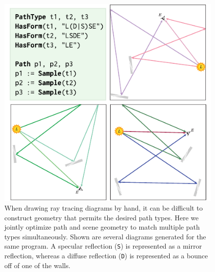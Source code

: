 \begin{figure}

   \centering
   \includegraphics[scale=1.5]{assets/penrose/rt-multiple-paths.pdf}
   \caption{When drawing ray tracing diagrams by hand, it can be difficult to construct geometry that permits the desired path types.  Here we jointly optimize path and scene geometry to match multiple path types simultaneously.  Shown are several diagrams generated for the same program. A specular reflection (\texttt{S}) is represented as a mirror reflection, whereas a diffuse reflection (\texttt{D}) is represented as a bounce off of one of the walls. \label{fig:rt-multiple-paths}}
\end{figure}


